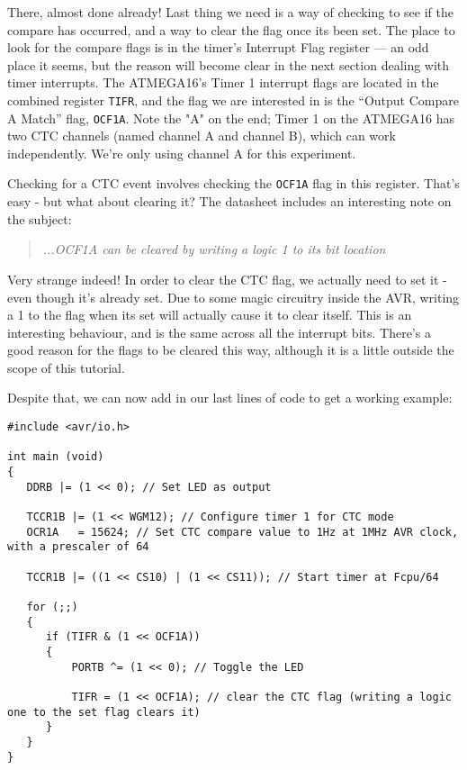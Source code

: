 \documentclass[a4paper,oneside,notitlepage]{book}
\begin{document}
There, almost done already! Last thing we need is a way of checking to see if the compare has occurred, and a way to clear the flag once its been set. The place to look for the compare flags is in the timer's Interrupt Flag register --- an odd place it seems, but the reason will become clear in the next section dealing with timer interrupts. The ATMEGA16's Timer 1 interrupt flags are located in the combined register \texttt{TIFR}, and the flag we are interested in is the ``Output Compare A Match'' flag, \texttt{OCF1A}. Note the "A" on the end; Timer 1 on the ATMEGA16 has two CTC channels (named channel A and channel B), which can work independently. We're only using channel A for this experiment.

Checking for a CTC event involves checking the \texttt{OCF1A} flag in this register. That's easy - but what about clearing it? The datasheet includes an interesting note on the subject:

\begin{quote}
\emph{...OCF1A can be cleared by writing a logic 1 to its bit location}
\end{quote}

Very strange indeed! In order to clear the CTC flag, we actually need to set it - even though it's already set. Due to some magic circuitry inside the AVR, writing a 1 to the flag when its set will actually cause it to clear itself. This is an interesting behaviour, and is the same across all the interrupt bits. There's a good reason for the flags to be cleared this way, although it is a little outside the scope of this tutorial.

Despite that, we can now add in our last lines of code to get a working example: 

\begin{center}
\begin{lstlisting}
#include <avr/io.h>

int main (void)
{
   DDRB |= (1 << 0); // Set LED as output

   TCCR1B |= (1 << WGM12); // Configure timer 1 for CTC mode
   OCR1A   = 15624; // Set CTC compare value to 1Hz at 1MHz AVR clock, with a prescaler of 64

   TCCR1B |= ((1 << CS10) | (1 << CS11)); // Start timer at Fcpu/64

   for (;;)
   {
      if (TIFR & (1 << OCF1A))
      {
          PORTB ^= (1 << 0); // Toggle the LED

          TIFR = (1 << OCF1A); // clear the CTC flag (writing a logic one to the set flag clears it)
      }
   }
}
\end{lstlisting}
\end{center}
\end{document}
